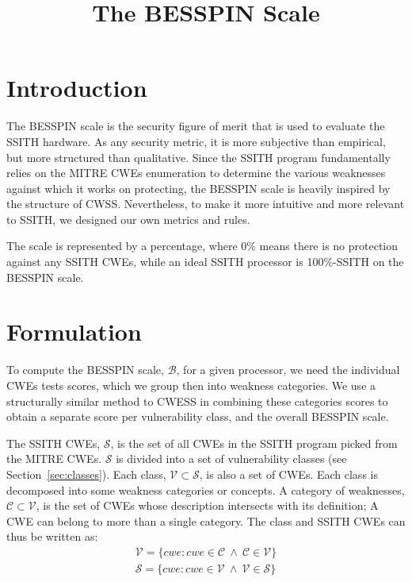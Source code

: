 \documentclass{article}
\title{The BESSPIN Scale}
\date{\vspace{-0.5cm}}
\begin{document}
\maketitle

\section{Introduction}

The BESSPIN scale is the security figure of merit that is used to evaluate the SSITH hardware. As any security metric, it is more subjective than empirical, but more structured than qualitative. Since the SSITH program fundamentally relies on the MITRE CWEs enumeration to determine the various weaknesses against which it works on protecting, the BESSPIN scale is heavily inspired by the structure of CWSS. Nevertheless, to make it more intuitive and more relevant to SSITH, we designed our own metrics and rules.

The scale is represented by a percentage, where 0\% means there is no protection against any SSITH CWEs, while an ideal SSITH processor is 100\%-SSITH on the BESSPIN scale. 

\section{Formulation}

To compute the BESSPIN scale, $\mathcal{B}$, for a given processor, we need the individual CWEs tests scores, which we group then into weakness categories. We use a structurally similar method to CWESS in combining these categories scores to obtain a separate score per vulnerability class, and the overall BESSPIN scale.

The SSITH CWEs, $\mathcal{S}$, is the set of all CWEs in the SSITH program picked from the MITRE CWEs. $\mathcal{S}$ is divided into a set of vulnerability classes (see Section~\ref{sec:classes}). Each class, $\mathcal{V} \subset \mathcal{S}$, is also a set of CWEs. Each class is decomposed into some weakness categories or concepts. A category of weaknesses, $\mathcal{C} \subset \mathcal{V}$, is the set of CWEs whose description intersects with its definition; A CWE can belong to more than a single category. The class and SSITH CWEs can thus be written as:
\begin{equation}
    \begin{array}{c}
        \mathcal{V} = \{ cwe : cwe \in \mathcal{C} \ \wedge \ \mathcal{C} \in \mathcal{V} \} \\
        \mathcal{S} = \{ cwe : cwe \in \mathcal{V} \ \wedge \ \mathcal{V} \in \mathcal{S} \} 
    \end{array}
\end{equation}
\end{document}
